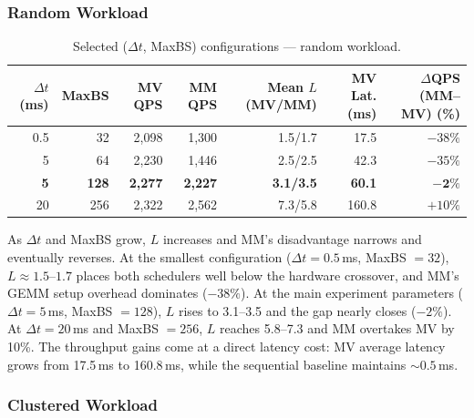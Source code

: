 \documentclass[sigconf, nonacm]{acmart}
\begin{document}
\subsubsection{Random Workload}

\begin{table}
  \caption{Selected ($\Delta t$, MaxBS) configurations --- random workload.}
  \label{tab:sweep-random}
  \begin{tabular}{rrrrrrr}
    \toprule
    $\Delta t$ (ms) & MaxBS & MV QPS & MM QPS & Mean $L$ (MV/MM) & MV Lat. (ms) & $\Delta$QPS (MM--MV) (\%) \\
    \midrule
    0.5               & 32               & 2,098          & 1,300          & 1.5/1.7 & 17.5  & $-38\%$ \\
    5                 & 64               & 2,230          & 1,446          & 2.5/2.5 & 42.3  & $-35\%$ \\
    \textbf{5}        & \textbf{128}     & \textbf{2,277} & \textbf{2,227} & \textbf{3.1/3.5} & \textbf{60.1} & $\mathbf{-2\%}$ \\
    20                & 256              & 2,322          & 2,562          & 7.3/5.8 & 160.8 & $+10\%$ \\
    \bottomrule
  \end{tabular}
\end{table}

As $\Delta t$ and MaxBS grow, $L$ increases and MM's disadvantage
narrows and eventually reverses. At the smallest configuration
($\Delta t = 0.5$\,ms, MaxBS $= 32$), $L \approx 1.5$--$1.7$ places
both schedulers well below the hardware crossover, and MM's GEMM setup
overhead dominates ($-38\%$). At the main experiment parameters
($\Delta t = 5$\,ms, MaxBS $= 128$), $L$ rises to 3.1--3.5 and the gap
nearly closes ($-2\%$). At $\Delta t = 20$\,ms and MaxBS $= 256$,
$L$ reaches 5.8--7.3 and MM overtakes MV by 10\%. The throughput gains
come at a direct latency cost: MV average latency grows from 17.5\,ms
to 160.8\,ms, while the sequential baseline maintains ${\sim}0.5$\,ms.

\subsubsection{Clustered Workload}
\end{document}
